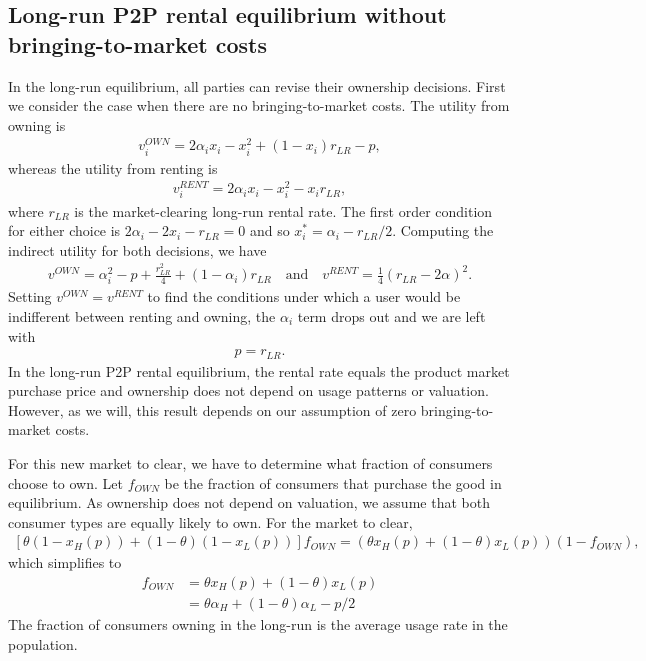 \documentclass[11pt]{article}
\begin{document}
\subsection{Long-run P2P rental equilibrium without bringing-to-market costs} 
In the long-run equilibrium, all parties can revise their ownership decisions. 
First we consider the case when there are no bringing-to-market costs.
The utility from owning is 
\begin{align}
v^{OWN}_i = 2\alpha_i x_i - x_i^2 + (1-x_i)r_{LR} - p,   
\end{align} 
whereas the utility from renting is 
\begin{align}
v^{RENT}_{i} = 2\alpha_i x_i - x_i^2 - x_i r_{LR}, 
\end{align} 
where $r_{LR}$ is the market-clearing long-run rental rate. 
The first order condition for either choice is $2 \alpha_i - 2 x_i - r_{LR} = 0$ and so $x^*_i = \alpha_i - r_{LR}/2$. 
Computing the indirect utility for both decisions, we have
\begin{align} 
v^{OWN} = \alpha_i^2 - p + \frac{r_{LR}^2}{4} + (1 - \alpha_i) r_{LR} \quad  \mbox{and} \quad v^{RENT} = \frac{1}{4} (r_{LR}- 2\alpha )^2. 
\end{align} 
Setting $v^{OWN} = v^{RENT}$ to find the conditions under which a user would be indifferent between renting and owning, the $\alpha_i$ term drops out and we are left with 
\begin{align} \label{eq:lr_eq_r}
p = r_{LR}. 
\end{align}
In the long-run P2P rental equilibrium, the rental rate equals the product market purchase price and ownership does not depend on usage patterns or valuation.  
However, as we will, this result depends on our assumption of zero bringing-to-market costs. 

For this new market to clear, we have to determine what fraction of consumers choose to own. 
Let $f_{OWN}$ be the fraction of consumers that purchase the good in equilibrium. 
As ownership does not depend on valuation, we assume that both consumer types are equally likely to own. 
For the market to clear, 
\begin{align}
\left[ \theta (1-x_H(p)) + (1-\theta)(1-x_L(p))\right]f_{OWN} = \left(\theta x_H(p) + (1-\theta)x_L(p) \right)(1- f_{OWN}), 
\end{align} 
which simplifies to 
\begin{align}
  f_{OWN} &= \theta x_H(p) + (1-\theta)x_L(p) \\
         &= \theta \alpha_H + (1 - \theta) \alpha_L- p/2
\end{align} 
The fraction of consumers owning in the long-run is the average usage rate in the population.  
\end{document}
